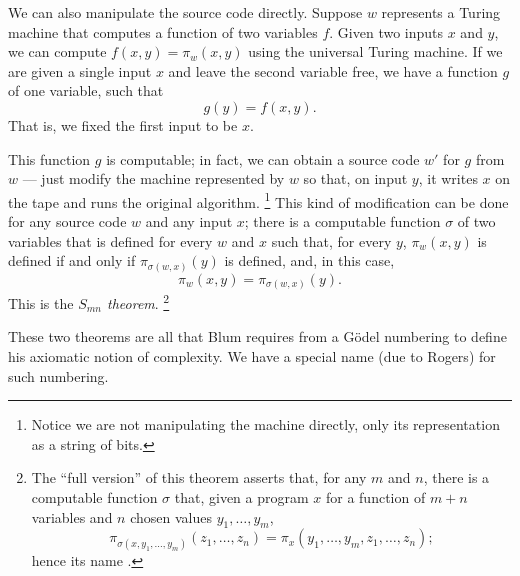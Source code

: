 \documentclass[12pt]{article}
\theoremstyle{definition}
\begin{document}
We can also manipulate the source code directly.
Suppose $w$ represents a Turing machine that computes a function of two variables $f$.
Given two inputs $x$ and $y$, we can compute $f(x, y) = \pi_w(x, y)$
using the universal Turing machine.
If we are given a single input $x$ and leave the second variable free,
we have a function $g$ of one variable, such that
\begin{equation*}
    g(y) = f(x, y).
\end{equation*}
That is, we fixed the first input to be $x$.

This function $g$ is computable;
in fact, we can obtain a source code $w'$ for $g$ from $w$
--- just modify the machine represented by $w$
so that, on input $y$,
it writes $x$ on the tape and runs the original algorithm.%
\footnote{
    Notice we are not manipulating the machine directly,
    only its representation as a string of bits.
}
This kind of modification can be done for any source code $w$
and any input $x$;
there is a computable function $\sigma$ of two variables
that is defined for every $w$ and $x$ such that,
for every $y$,
$\pi_w(x, y)$ is defined if and only if $\pi_{\sigma(w, x)}(y)$ is defined,
and, in this case,
\begin{equation*}
    \pi_w(x, y) = \pi_{\sigma(w, x)}(y).
\end{equation*}
This is the \emph{$S_{mn}$ theorem}.%
\footnote{
    The ``full version'' of this theorem asserts that,
    for any $m$ and $n$,
    there is a computable function $\sigma$ that,
    given a program $x$ for a function of $m + n$ variables
    and $n$ chosen values $y_1, \dots, y_m$,
    \begin{equation*}
        \pi_{\sigma(x, y_1, \dots, y_m)}(z_1, \dots, z_n) =
            \pi_x(y_1, \dots, y_m, z_1, \dots, z_n);
    \end{equation*}
    hence its name \cite[p.~23]{Rogers1987}.
}

These two theorems are all that Blum requires from a Gödel numbering
to define his axiomatic notion of complexity.
We have a special name (due to Rogers) for such numbering.
\end{document}
